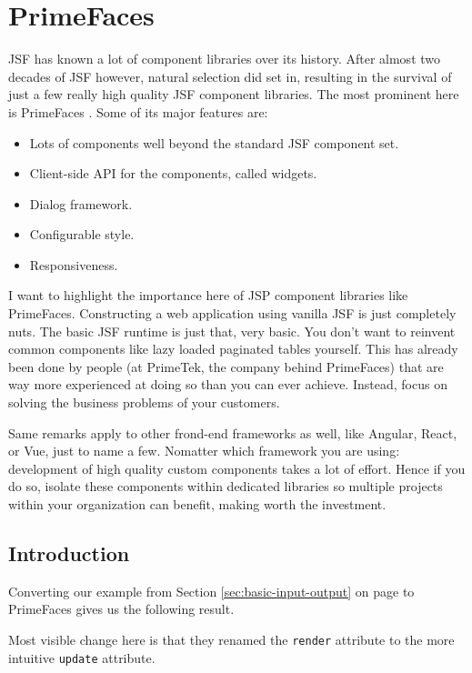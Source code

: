 %

\chapter{PrimeFaces}

JSF has known a lot of component libraries over its history.
After almost two decades of JSF however, natural selection did set in,
resulting in the survival of just a few really high quality JSF component libraries.
The most prominent here is PrimeFaces \cite{PrimeFaces}.
Some of its major features are:
\begin{itemize}
	\item Lots of components well beyond the standard JSF component set.
	\item Client-side API for the components, called widgets.
	\item Dialog framework.
	\item Configurable style.
	\item Responsiveness.
\end{itemize}
I want to highlight the importance here of JSP component libraries like PrimeFaces.
Constructing a web application using vanilla JSF is just completely nuts.
The basic JSF runtime is just that, very basic.
You don't want to reinvent common components like lazy loaded paginated tables yourself.
This has already been done by people (at PrimeTek, the company behind PrimeFaces) that are way more experienced at doing so than you can ever achieve.
Instead, focus on solving the business problems of your customers.

Same remarks apply to other frond-end frameworks as well, like Angular, React, or Vue, just to name a few.
Nomatter which framework you are using: development of high quality custom components takes a lot of effort.
Hence if you do so, isolate these components within dedicated libraries so multiple projects within your organization can benefit, making worth the investment.


\section{Introduction}
Converting our  example from Section \ref{sec:basic-input-output}  on page \pageref{sec:basic-input-output} to PrimeFaces gives us the following result.

Most visible change here is that they renamed the \texttt{render} attribute to the more intuitive \texttt{update} attribute.

